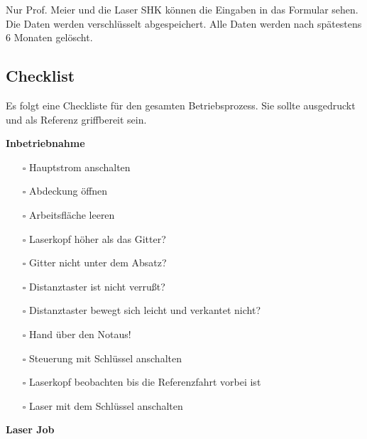 \documentclass[]{article}
\providecommand{\tightlist}{%
  \setlength{\itemsep}{0pt}\setlength{\parskip}{0pt}}
\begin{document}
Nur Prof. Meier und die Laser SHK können die Eingaben in das Formular
sehen. Die Daten werden verschlüsselt abgespeichert. Alle Daten werden
nach spätestens 6 Monaten gelöscht.

\hypertarget{checklist}{%
\subsection{Checklist}\label{checklist}}

Es folgt eine Checkliste für den gesamten Betriebsprozess. Sie sollte
ausgedruckt und als Referenz griffbereit sein.

\textbf{Inbetriebnahme}

\begin{itemize}
\tightlist
\item[$\square$]
  Hauptstrom anschalten
\item[$\square$]
  Abdeckung öffnen\\
\item[$\square$]
  Arbeitsfläche leeren\\
\item[$\square$]
  Laserkopf höher als das Gitter?\\
\item[$\square$]
  Gitter nicht unter dem Absatz?\\
\item[$\square$]
  Distanztaster ist nicht verrußt?\\
\item[$\square$]
  Distanztaster bewegt sich leicht und verkantet nicht?\\
\item[$\square$]
  Hand über den Notaus!\\
\item[$\square$]
  Steuerung mit Schlüssel anschalten\\
\item[$\square$]
  Laserkopf beobachten bis die Referenzfahrt vorbei ist\\
\item[$\square$]
  Laser mit dem Schlüssel anschalten
\end{itemize}

\textbf{Laser Job}
\end{document}
